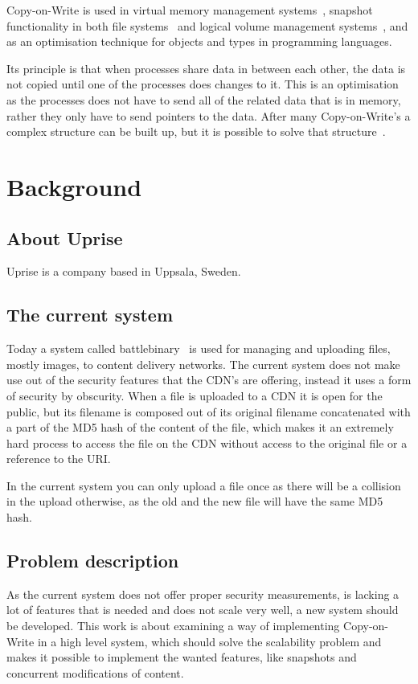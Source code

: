 \documentclass[a4paper,12pt]{article}
\begin{document}
Copy-on-Write is used in virtual memory management systems~\cite{VIRTCOW}, snapshot functionality in both file 
systems~\cite{FSCOW} and logical volume management systems~\cite{LVMCOW}, and as an optimisation technique for objects and 
types in programming languages\cite{LANGCOW}.

Its principle is that when processes share data in between each other, the data is not copied until one of the processes 
does changes to it. This is an optimisation as the processes does not have to send all of the related data that is in memory, 
rather they only have to send pointers to the data. After many Copy-on-Write's a complex structure can be built up, 
but it is possible to solve that structure~\cite{COPYONWRITE2}.



\section{Background}
\subsection{About Uprise}
Uprise is a company based in Uppsala, Sweden. 

\subsection{The current system}
Today a system called battlebinary~\cite{BATTLEBINARY} is used for managing and uploading files, mostly images, to content 
delivery networks. The current system does not make use out of the security features that the CDN's are offering, instead it 
uses a form of security by obscurity. When a file is uploaded to a CDN it is open for the public, but its filename is 
composed out of its original filename concatenated with a part of the MD5 hash of the content of the file, which makes it an 
extremely hard process to access the file on the CDN without access to the original file or a reference to the URI.

In the current system you can only upload a file once as there will be a collision in the upload otherwise, as the old and 
the new file will have the same MD5 hash.  

\subsection{Problem description}
As the current system does not offer proper security measurements, is lacking a lot of features that is needed and does not 
scale very well, a new system should be developed. This work is about examining a way of implementing Copy-on-Write in a 
high level system, which should solve the scalability problem and makes it possible to implement the wanted features, like 
snapshots and concurrent modifications of content.
\end{document}
